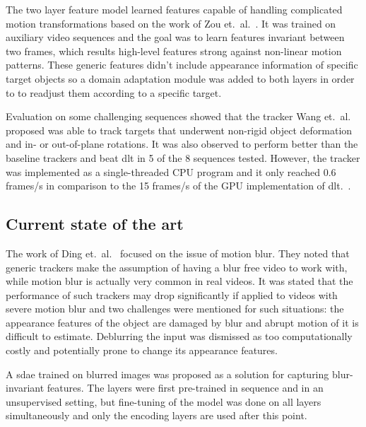 The two layer feature model learned features capable of handling complicated motion
transformations based on the work of Zou et.~al.~\cite{INVARIANT_FEATS}. It was trained
on auxiliary video sequences and the goal was to learn features invariant between two
frames, which results high-level features strong against non-linear motion patterns. These
generic features didn't include appearance information of specific target objects so a
domain adaptation module was added to both layers in order to to readjust them according
to a specific target.~\cite{LEARNED_HIERARCH}

Evaluation on some challenging sequences showed that the tracker Wang et.~al.~\cite{LEARNED_HIERARCH}
proposed was able to track targets that underwent non-rigid object deformation and in- or
out-of-plane rotations. It was also observed to perform better than the baseline
trackers and beat \ac{dlt} in 5 of the 8 sequences tested. However, the tracker was implemented
as a single-threaded CPU program and it only reached 0.6 frames/s in comparison to the 15
frames/s of the GPU implementation of \ac{dlt}.~\cite{DLT}.

\subsection{Current state of the art}

The work of Ding et.~al.~\cite{BLUR_TRACK} focused on the issue of motion blur.
They noted that generic trackers make the assumption of having a blur free video
to work with, while motion blur is actually very common in real videos. It was stated
that the performance of such trackers may drop significantly if applied to videos with
severe motion blur and two challenges were mentioned for such situations: the appearance
features of the object are damaged by blur and abrupt motion of it is difficult to
estimate. Deblurring the input was dismissed as too computationally costly and potentially
prone to change its appearance features.~\cite{BLUR_TRACK}

A \ac{sdae} trained on blurred images was proposed as a solution for capturing blur-invariant
features. The layers were first pre-trained in sequence and in an unsupervised setting,
but fine-tuning of the model was done on all layers simultaneously and only the encoding
layers are used after this point.~\cite{BLUR_TRACK}

